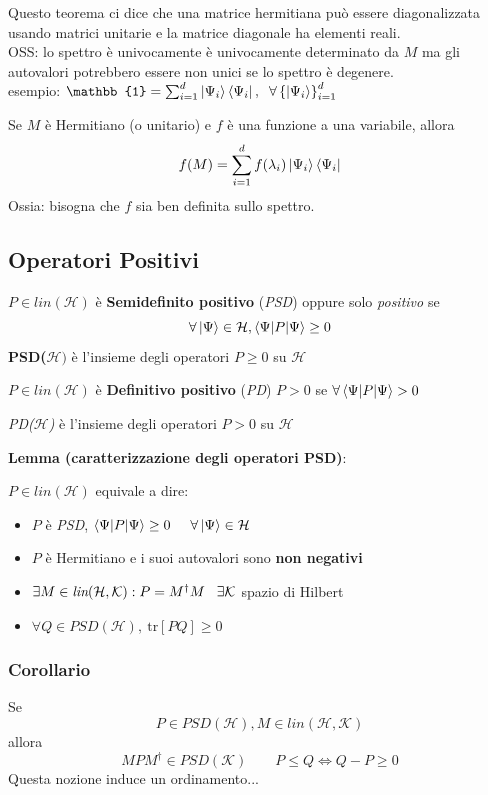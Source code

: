Questo teorema ci dice che una matrice hermitiana può essere diagonalizzata usando matrici unitarie e la matrice diagonale ha elementi reali.
\medskip
\\OSS: lo spettro è univocamente è univocamente determinato da $M$ ma gli autovalori potrebbero essere non unici se lo spettro è degenere.
\\esempio: $\mathbb{1} = \sum^d_{i=1}\ket{\Psi_i}\bra{\Psi_i}, \hspace{0.2cm} \forall \left\{ \ket{\Psi_i}\right\} ^d_{i=1}$ 

\medskip
Se $M$ è Hermitiano  (o unitario) e $f$ è una funzione a una variabile, allora
$$f(M) = \sum^d_{i=1} f(\lambda_i)\ket{\Psi_i} \bra{\Psi_i}$$
Ossia: bisogna che $f$ sia ben definita sullo spettro.

\subsection{Operatori Positivi}
$P \in \textit{lin}(\mathcal{H})$ è \textbf{Semidefinito positivo} (\textit{PSD}) oppure solo \textit{positivo} se
$$\forall \ket{\Psi} \in \mathcal{H}, \braket{\Psi|P|\Psi} \ge 0$$
\textbf{PSD($\mathcal{H})$} è l'insieme degli operatori $P\ge 0$ su $\mathcal{H}$
\medskip

$P \in \textit{lin}(\mathcal{H})$ è \textbf{Definitivo positivo} (\textit{PD}) $P > 0$ se $\forall \braket{\Psi|P| \Psi} > 0$

\medskip
\textit{PD($\mathcal{H}$)} è l'insieme degli operatori $P > 0$ su $\mathcal{H}$

\medskip 
\textbf{Lemma (caratterizzazione degli operatori PSD)}:

$P \in \textit{lin}(\mathcal{H})$ equivale a dire:
\begin{itemize}
	\item[\textbf{A.}] $P$ è \textit{PSD}, $\braket{\Psi|P|\Psi} \ge 0 \hspace{0.5cm} \forall\ket{\Psi}\in\mathcal{H}$ 
	\item[\textbf{B.}] $P$ è Hermitiano e i suoi autovalori sono \textbf{non negativi}
	\item[\textbf{C.}] $\exists M \in \textit{lin}(\mathcal{H,K}):P=M^\dagger M \hspace{0.3cm} \exists \mathcal{K}$ spazio di Hilbert
	\item[\textbf{D.}] $\forall Q \in PSD(\mathcal{H}),\  \text{tr}[PQ] \ge 0$
\end{itemize}

\subsubsection{Corollario}
Se $$P \in PSD(\mathcal{H}), M \in \textit{lin}(\mathcal{H,K})$$ allora $$MPM^\dagger \in PSD(\mathcal{K}) \qquad P\le Q \Leftrightarrow Q-P \ge 0$$
Questa nozione induce un ordinamento...

